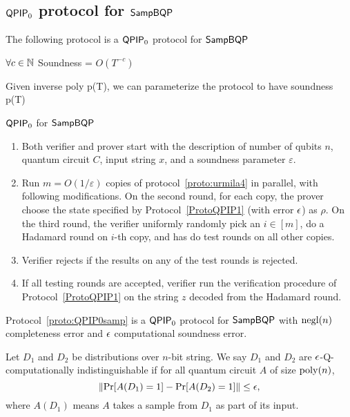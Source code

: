 \subsection{$\operatorname{\mathsf{QPIP}}_0$ protocol for $\operatorname{\mathsf{SampBQP}}$}

The following protocol is a $\operatorname{\mathsf{QPIP}}_0$ protocol for $\operatorname{\mathsf{SampBQP}}$

$\forall c\in\mathbb{N}$ Soundness = $O(T^{-c})$

Given inverse poly p(T), we can parameterize the protocol to have soundness p(T)




\begin{protocol}{$\operatorname{\mathsf{QPIP}}_0$ for $\operatorname{\mathsf{SampBQP}}$}
\label{proto:QPIP0samp}
\begin{enumerate}
    \item Both verifier and prover start with the description of number of qubits $n$, quantum circuit $C$, input string $x$, and  a soundness parameter $\varepsilon$.
    \item Run $m=O(1/\varepsilon)$ copies of protocol~\ref{proto:urmila4} in parallel, with following modifications. On the second round, for each copy, the prover choose the state specified by Protocol~\ref{ProtoQPIP1}  (with error $\epsilon$) as $\rho$. On the third round, the verifier uniformly randomly pick an $i\in [m]$, do a Hadamard round on $i$-th copy, and has do test rounds on all other copies.
    \item \label{step:multi-testing}Verifier rejects if the results on any of the test rounds is rejected. 
    \item If all testing rounds are accepted, verifier run the verification procedure of Protocol~\ref{ProtoQPIP1} on the string $z$ decoded from the Hadamard round.
\end{enumerate}
\end{protocol}

\begin{theorem}\label{thm:urmila-binding}
    Protocol~\ref{proto:QPIP0samp} is a $\operatorname{\mathsf{QPIP}}_0$ protocol for $\operatorname{\mathsf{SampBQP}}$ with $\operatorname{negl}(n)$ completeness error and $\epsilon$ computational soundness error. 
\end{theorem}

\begin{definition}
Let  $D_1$ and $D_2$ be distributions over $n$-bit string.  We say $D_1$ and $D_2$  are $\epsilon$-Q-computationally indistinguishable if for all quantum circuit $A$ of size $\operatorname*{\operatorname{poly}}(n)$, $$\left\|\Pr[A({D_1})=1]-\Pr[A({D_2})=1]  \right\| \leq \epsilon,$$  where $A(D_1)$ means $A$ takes a sample from $D_1$ as part of its input. 
\end{definition}

